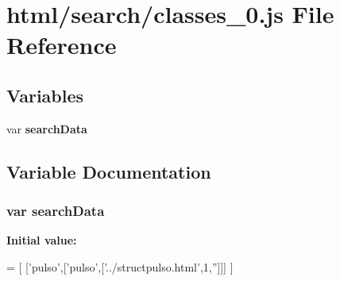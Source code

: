 \section{html/search/classes\+\_\+0.js File Reference}
\label{classes__0_8js}
\subsection*{Variables}
\begin{DoxyCompactItemize}
\item 
var {\bf search\+Data}
\end{DoxyCompactItemize}


\subsection{Variable Documentation}
\subsubsection[{search\+Data}]{\setlength{\rightskip}{0pt plus 5cm}var search\+Data}\label{classes__0_8js_ad01a7523f103d6242ef9b0451861231e}
{\bfseries Initial value\+:}
\begin{DoxyCode}
=
[
  [\textcolor{stringliteral}{'pulso'},[\textcolor{stringliteral}{'pulso'},[\textcolor{stringliteral}{'../structpulso.html'},1,\textcolor{stringliteral}{''}]]]
]
\end{DoxyCode}
